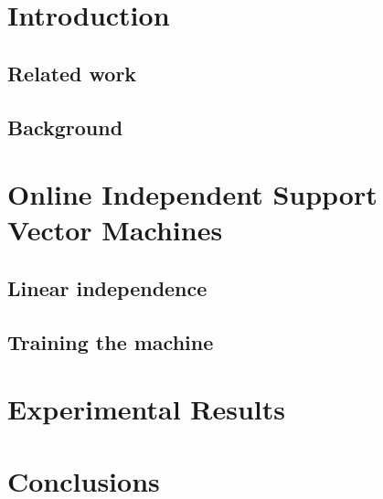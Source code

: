 \documentclass[10pt,twocolumn,letterpaper]{article}
\begin{document}

\section{Introduction}

\subsection*{Related work}

\subsection*{Background}
\label{sec:bg}

\section{Online Independent Support Vector Machines}
\label{sec:opt}

\subsection*{Linear independence}

\subsection*{Training the machine}

\section{Experimental Results}
\label{sec:exp}

\section{Conclusions}
\label{sec:concl}


{\small


}
\end{document}
